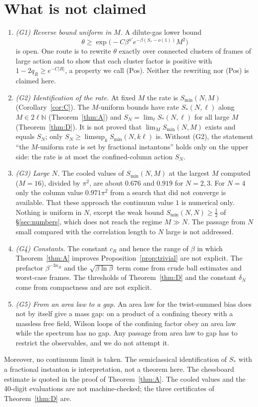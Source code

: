 \documentclass[11pt,a4paper]{article}
\theoremstyle{definition}
\theoremstyle{remark}
\begin{document}
\section{What is not claimed}\label{sec:notclaimed}

\begin{enumerate}[leftmargin=*]
\item \emph{(G1) Reverse bound uniform in $M$.} A dilute-gas lower bound
\[ \theta\ge\exp\big(-C\beta^{a'}e^{-\beta(S_*-o(1))}M^2\big) \]
is open. One route is to rewrite $\theta$ exactly over connected clusters of frames of large action and to show that each cluster factor is positive with $1-2q_R\ge e^{-C|R|}$, a property we call (Pos). Neither the rewriting nor (Pos) is claimed here.
\item \emph{(G2) Identification of the rate.} At fixed $M$ the rate is $S_{\min}(N,M)$ (Corollary~\ref{cor:C}). The $M$-uniform bounds have rate $S_*(N,\ell)$ along $M\in2\ell\mathbb{N}$ (Theorem~\ref{thm:A}) and $S_N=\lim_\ell S_*(N,\ell)$ for all large $M$ (Theorem~\ref{thm:D}). It is not proved that $\lim_MS_{\min}(N,M)$ exists and equals $S_N$; only $S_N\ge\limsup_k S_{\min}(N,k\ell)$ is. Without (G2), the statement ``the $M$-uniform rate is set by fractional instantons'' holds only on the upper side: the rate is at most the confined-column action $S_N$.
\item \emph{(G3) Large $N$.} The cooled values of $S_{\min}(N,M)$ at the largest $M$ computed ($M=16$), divided by $\pi^2$, are about $0.676$ and $0.919$ for $N=2,3$. For $N=4$ only the column value $0.971\pi^2$ from a search that did not converge is available. That these approach the continuum value $1$ is numerical only. Nothing is uniform in $N$, except the weak bound $S_{\min}(N,N)\ge\frac12$ of \S\ref{sec:numbers}, which does not reach the regime $M\gg N$. The passage from $N$ small compared with the correlation length to $N$ large is not addressed.
\item \emph{(G4) Constants.} The constant $c_R$ and hence the range of $\beta$ in which Theorem~\ref{thm:A} improves Proposition~\ref{prop:trivial} are not explicit. The prefactor $\beta^{-3n_B}$ and the $\sqrt{\beta\ln\beta}$ term come from crude ball estimates and worst-case frames. The thresholds of Theorem~\ref{thm:D} and the constant $\delta_N$ come from compactness and are not explicit.
\item \emph{(G5) From an area law to a gap.} An area law for the twist-summed bias does not by itself give a mass gap: on a product of a confining theory with a massless free field, Wilson loops of the confining factor obey an area law while the spectrum has no gap. Any passage from area law to gap has to restrict the observables, and we do not attempt it.
\end{enumerate}
Moreover, no continuum limit is taken.
The semiclassical identification of $S_*$ with a fractional instanton is interpretation, not a theorem here.
The chessboard estimate is quoted in the proof of Theorem~\ref{thm:A}.
The cooled values and the 40-digit evaluations are not machine-checked; the three certificates of Theorem~\ref{thm:D} are.
\end{document}
